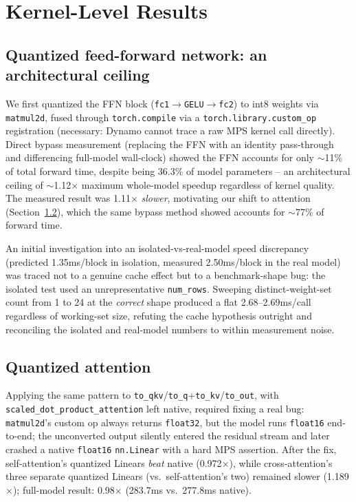 \documentclass[11pt]{article}
\newcommand{\code}[1]{\texttt{#1}}
\begin{document}
\section{Kernel-Level Results}
\label{sec:ffn}

\subsection{Quantized feed-forward network: an architectural ceiling}
We first quantized the FFN block (\code{fc1}$\rightarrow$\code{GELU}$\rightarrow$\code{fc2}) to
int8 weights via \code{matmul2d}, fused through \code{torch.compile} via a
\code{torch.library.custom\_op} registration (necessary: Dynamo cannot trace a raw MPS kernel
call directly). Direct bypass measurement (replacing the FFN with an identity pass-through and
differencing full-model wall-clock) showed the FFN accounts for only $\sim$11\% of total forward
time, despite being 36.3\% of model parameters -- an architectural ceiling of $\sim$1.12$\times$
maximum whole-model speedup regardless of kernel quality. The measured result was 1.11$\times$
\emph{slower}, motivating our shift to attention (Section~\ref{sec:attention}), which the same
bypass method showed accounts for $\sim$77\% of forward time.

An initial investigation into an isolated-vs-real-model speed discrepancy (predicted 1.35ms/block
in isolation, measured 2.50ms/block in the real model) was traced not to a genuine cache effect
but to a benchmark-shape bug: the isolated test used an unrepresentative \code{num\_rows}. Sweeping
distinct-weight-set count from 1 to 24 at the \emph{correct} shape produced a flat
2.68--2.69ms/call regardless of working-set size, refuting the cache hypothesis outright and
reconciling the isolated and real-model numbers to within measurement noise.

\subsection{Quantized attention}
\label{sec:attention}
Applying the same pattern to \code{to\_qkv}/\code{to\_q}+\code{to\_kv}/\code{to\_out}, with
\code{scaled\_dot\_product\_attention} left native, required fixing a real bug:
\code{matmul2d}'s custom op always returns \code{float32}, but the model runs \code{float16}
end-to-end; the unconverted output silently entered the residual stream and later crashed a
native \code{float16} \code{nn.Linear} with a hard MPS assertion. After the fix, self-attention's
quantized Linears \emph{beat} native (0.972$\times$), while cross-attention's three separate
quantized Linears (vs.\ self-attention's two) remained slower (1.189$\times$); full-model result:
0.98$\times$ (283.7ms vs.\ 277.8ms native).
\end{document}
